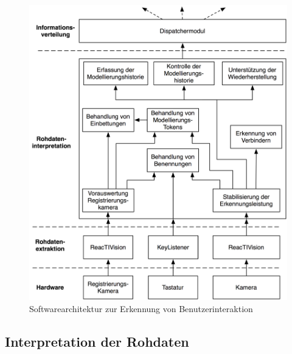 \begin{figure}[htbp]
	\centering
		\includegraphics[width=15cm]{img/ImplementierungInput/InputArchitecture.png}
	\caption{Softwarearchitektur zur Erkennung von Benutzerinteraktion}
	\label{fig:img_ImplementierungInput_InputArchitecture}
\end{figure}


\subsection{Interpretation der Rohdaten} %
\label{sub:interpretation_der_rohdaten}

